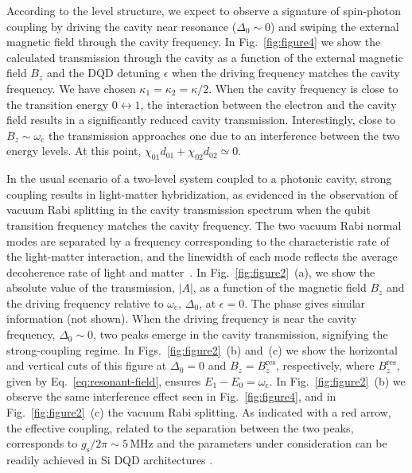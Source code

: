 \documentclass[twocolumn,english,aps,prl,preprint,reprint,showpacs,longbibliography,showkeys]{revtex4-1}
\begin{document}
According to the level structure, we expect to observe a signature of spin-photon coupling by driving the cavity near resonance ($\Delta_0\sim0$) and swiping the external magnetic field  through the cavity frequency.
In Fig.~\ref{fig:figure4} we show the calculated transmission through the cavity 
    as a function of the external magnetic field $B_z$ and the DQD detuning $\epsilon$ when the driving frequency matches the cavity frequency. We have chosen $\kappa_1=\kappa_2=\kappa/2$. When the cavity frequency is close to the transition energy $0\leftrightarrow 1$, the interaction between the electron and the cavity field   
 results in a significantly reduced cavity transmission.
 Interestingly, close to $B_z\sim\omega_{\mathrm{c}}$ the transmission approaches one due to an interference between the two energy levels. At this point, $\chi_{01}d_{01}+\chi_{02}d_{02}\simeq0$. 








In the usual scenario of a two-level system 
coupled to a photonic cavity, 
strong coupling results in light-matter hybridization, as evidenced
 in the observation of vacuum Rabi splitting 
in the cavity transmission spectrum when the qubit transition frequency matches the cavity frequency.
The two vacuum Rabi normal modes are separated by a frequency corresponding to the characteristic rate of the light-matter interaction, and the linewidth of each mode reflects the  average decoherence rate of light and matter~\cite{Thompson1992}.
In  Fig.~\ref{fig:figure2}~(a), we show
the absolute value of the transmission, $|A|$, as a function of the magnetic field $B_z$ and the driving frequency relative to $\omega_{\mathrm{c}}$, $\Delta_0$,  at $\epsilon=0$. The phase gives similar information (not shown). 
When the driving frequency is near the cavity frequency, $\Delta_0\sim0$, two peaks emerge in the cavity transmission, signifying the strong-coupling regime.
In Figs.~\ref{fig:figure2}~(b) and~(c) we show the horizontal and vertical cuts of this figure at $\Delta_0=0$ and $B_z=B_z^{\mathrm{res}}$, respectively, where $B_z^{\mathrm{res}}$, given by Eq.~\eqref{eq:resonant-field}, ensures $E_1-E_0=\omega_{\mathrm{c}}$.  In Fig.~\ref{fig:figure2}~(b) we  observe the same interference effect seen in Fig.~\ref{fig:figure4}, and in Fig.~\ref{fig:figure2}~(c) the vacuum Rabi splitting. As indicated  with a red arrow, the effective coupling, related to the separation between the two peaks,  corresponds to $g_{\mathrm{s}}/2\pi\sim 5 \,\mathrm{MHz}$ and the parameters under consideration can be readily achieved in Si DQD architectures \citep{Mi2017,Mi2017b}.
\end{document}
